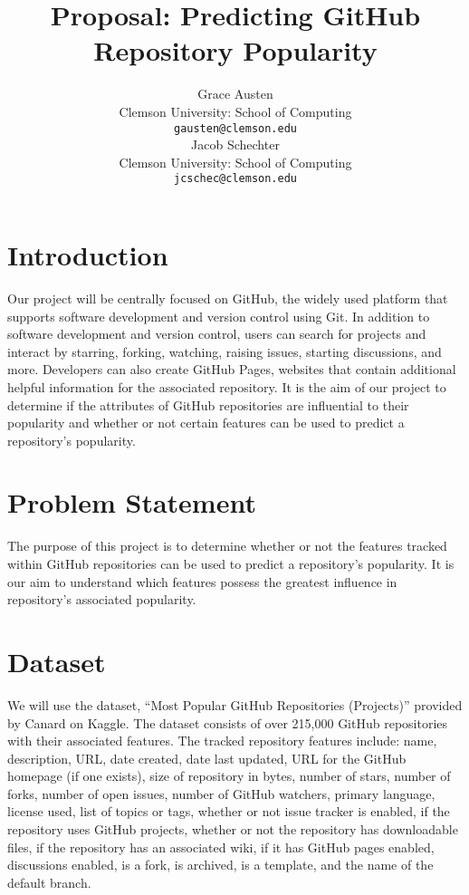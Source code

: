 \documentclass{article}
\title{Proposal: Predicting GitHub Repository Popularity}
\author{%
    Grace Austen \\
    Clemson University: School of Computing \\
    \texttt{gausten@clemson.edu} \\
    \And Jacob Schechter \\
    Clemson University: School of Computing \\
    \texttt{jcschec@clemson.edu} \\
}
\begin{document}
\maketitle


\section{Introduction}

Our project will be centrally focused on GitHub, the widely used platform that supports software development and version control using Git. In addition to software development and version control, users can search for projects and interact by starring, forking, watching, raising issues, starting discussions, and more. Developers can also create GitHub Pages, websites that contain additional helpful information for the associated repository. It is the aim of our project to determine if the attributes of GitHub repositories are influential to their popularity and whether or not certain features can be used to predict a repository’s popularity.


\section{Problem Statement}

The purpose of this project is to determine whether or not the features tracked within GitHub repositories can be used to predict a repository’s popularity. It is our aim to understand which features possess the greatest influence in repository’s associated popularity.


\section{Dataset}

We will use the dataset, “Most Popular GitHub Repositories (Projects)” provided by Canard on Kaggle. The dataset consists of over 215,000 GitHub repositories with their associated features. The tracked repository features include: name, description, URL, date created, date last updated, URL for the GitHub homepage (if one exists), size of repository in bytes, number of stars, number of forks, number of open issues, number of GitHub watchers, primary language, license used, list of topics or tags, whether or not issue tracker is enabled, if the repository uses GitHub projects, whether or not the repository has downloadable files, if the repository has an associated wiki, if it has GitHub pages enabled, discussions enabled, is a fork, is archived, is a template, and the name of the default branch.
\end{document}
